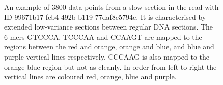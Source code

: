 \begin{figure}
\centering

	\caption[An example of 3800 data points from a slow section in the read with ID 99671b17-feb4-492b-b119-77daf8e5794e.]{\label{fig:slow-section}An example of 3800 data points from a slow section in the read with ID 99671b17-feb4-492b-b119-77daf8e5794e. It is characterised by extended low-variance sections between regular DNA sections. The 6-mers GTCCCA, TCCCAA and CCAAGT are mapped to the regions between the red and orange, orange and blue, and blue and purple vertical lines respectively. CCCAAG is also mapped to the orange-blue region but not as cleanly. In order from left to right the vertical lines are coloured red, orange, blue and purple.}
\end{figure}
